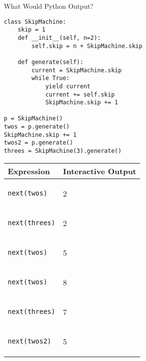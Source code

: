 \question What Would Python Output?
\begin{lstlisting}
class SkipMachine:
    skip = 1
    def __init__(self, n=2):
        self.skip = n + SkipMachine.skip

    def generate(self):
        current = SkipMachine.skip
        while True:
            yield current
            current += self.skip
            SkipMachine.skip += 1

p = SkipMachine()
twos = p.generate()
SkipMachine.skip += 1
twos2 = p.generate()
threes = SkipMachine(3).generate()
\end{lstlisting}
\begin{tabular}{|p{5cm}|p{5cm}|}
\hline
\textbf{Expression} & \textbf{Interactive Output}\\\hline
\begin{lstlisting}
next(twos)
\end{lstlisting} & \begin{solution}
2
\end{solution}\\ \hline
\begin{lstlisting}
next(threes)
\end{lstlisting} & \begin{solution}
2
\end{solution} \\ \hline
\begin{lstlisting}
next(twos)
\end{lstlisting} & \begin{solution}
5
\end{solution} \\ \hline
\begin{lstlisting}
next(twos)
\end{lstlisting} & \begin{solution}
8
\end{solution} \\ \hline
\begin{lstlisting}
next(threes)
\end{lstlisting} & \begin{solution}
7
\end{solution} \\ \hline
\begin{lstlisting}
next(twos2)
\end{lstlisting} &  \begin{solution}
5
\end{solution}\\ \hline
\end{tabular}
